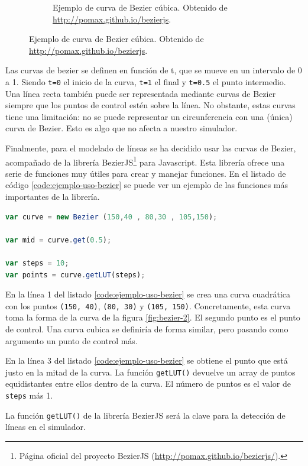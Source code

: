 \begin{figure}[!ht]
\begin{adjustwidth}{\oddsidemargin-1in}{\rightmargin}
\begin{subfigure}{\paperwidth}
	\caption{Ejemplo de curva de Bezier cúbica. Obtenido de \url{http://pomax.github.io/bezierjs}.}				
				\label{fig:bezier-3}
			\end{subfigure}
	\end{adjustwidth}
\end{figure}


Las curvas de bezier se definen en función de t, que se mueve en un intervalo de 0 a 1. Siendo \texttt{t=0} el inicio de la curva, \texttt{t=1} el final y \texttt{t=0.5} el punto intermedio. Una línea recta también puede ser representada mediante curvas de Bezier siempre que los puntos de control estén sobre la línea. No obstante, estas curvas tiene una limitación: no se puede representar un circunferencia con una (única) curva de Bezier. Esto es algo que no afecta a nuestro simulador.

Finalmente, para el modelado de líneas se ha decidido usar las curvas de Bezier, acompañado de la librería BezierJS\footnote{Página oficial del proyecto BezierJS (\url{http://pomax.github.io/bezierjs/}).} para Javascript. Esta librería ofrece una serie de funciones muy útiles para crear y manejar funciones. En el listado de código \ref{code:ejemplo-uso-bezier} se puede ver un ejemplo de las funciones más importantes de la librería. 

\begin{lstlisting}[language={Javascript},label={code:ejemplo-uso-bezier}, caption={Ejemplo de uso de las funciones de la librería BezierJS.}]
var curve = new Bezier (150,40 , 80,30 , 105,150);

var mid = curve.get(0.5);

var steps = 10;
var points = curve.getLUT(steps);
\end{lstlisting}

En la línea 1 del listado \ref{code:ejemplo-uso-bezier} se crea una curva cuadrática con los puntos \texttt{(150, 40)}, \texttt{(80, 30)} y \texttt{(105, 150)}. Concretamente, esta curva toma la forma de la curva de la figura \ref{fig:bezier-2}. El segundo punto es el punto de control. Una curva cubica se definiría de forma similar, pero pasando como argumento un punto de control más. 

En la línea 3 del listado \ref{code:ejemplo-uso-bezier} se obtiene el punto que está justo en la mitad de la curva. La función \texttt{getLUT()} devuelve un array de puntos equidistantes entre ellos dentro de la curva. El número de puntos es el valor de \texttt{steps} más 1.

La función \texttt{getLUT()} de la librería BezierJS será la clave para la detección de líneas en el simulador.


